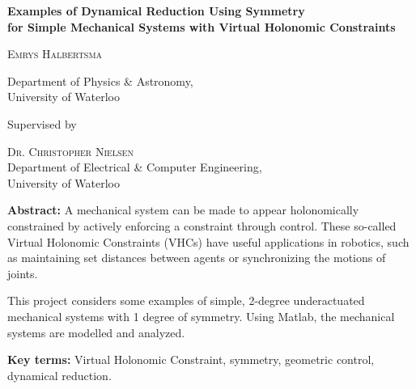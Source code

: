 \thispagestyle{plain}
\begin{center}
    \Large{
    \textbf{Examples of Dynamical Reduction Using Symmetry \\for Simple Mechanical Systems with Virtual Holonomic Constraints}
    }
        
    \vspace{0.4cm}
    \large{\scshape
    Emrys Halbertsma
    }\\
    \normalsize{
        Department of Physics \& Astronomy,\\
        University of Waterloo
    
        \vspace{0.4cm}
        Supervised by\\}
    \large{\scshape
    Dr. Christopher Nielsen
    }\\
    \normalsize{
        Department of Electrical \& Computer Engineering,\\
        University of Waterloo
    }
    \vspace{1.0cm}
    
\begin{minipage}{0.85\textwidth}
\normalsize
    \textbf{Abstract:} A mechanical system can be made to appear holonomically constrained by actively enforcing a constraint through control. These so-called Virtual Holonomic Constraints (VHCs) have useful applications in robotics, such as maintaining set distances between agents or synchronizing the motions of joints. 

This project considers some examples of simple, 2-degree underactuated mechanical systems with 1 degree of symmetry. Using Matlab, the mechanical systems are modelled and analyzed.

\vspace{5mm}
\textbf{Key terms:} Virtual Holonomic Constraint, symmetry, geometric control, dynamical reduction.
\end{minipage}
\end{center}